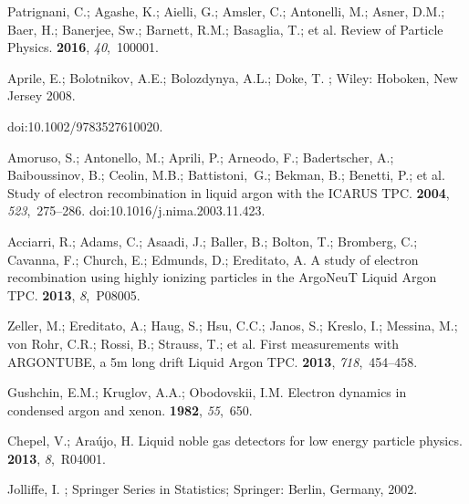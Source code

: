 \documentclass[instruments,article,accept,moreauthors,pdftex]{Definitions/mdpi}
\begin{document}
\begin{thebibliography}{999}
Patrignani, C.; Agashe, K.; Aielli, G.; Amsler, C.; Antonelli, M.; Asner, D.M.; Baer, H.; Banerjee, Sw.; Barnett, R.M.; Basaglia, T.; et al.   
\newblock Review of Particle Physics.
 {\bf 2016}, {\em 40},~100001.

Aprile, E.; Bolotnikov, A.E.; Bolozdynya, A.L.; Doke, T.
; Wiley: Hoboken, New Jersey  2008.

\newblock
  doi:10.1002/9783527610020.

Amoruso, S.; Antonello, M.; Aprili, P.; Arneodo, F.; Badertscher, A.; Baiboussinov, B.; Ceolin, M.B.; Battistoni,~G.; Bekman, B.; Benetti, P.; et al.
\newblock Study of electron recombination in liquid argon with the ICARUS TPC.
 {\bf 2004},
  {\em 523},~275--286.
\newblock
  doi:10.1016/j.nima.2003.11.423.

Acciarri, R.; Adams, C.; Asaadi, J.; Baller, B.; Bolton, T.; Bromberg, C.; Cavanna, F.; Church, E.; Edmunds, D.; Ereditato, A.
\newblock A study of electron recombination using highly ionizing particles in
  the ArgoNeuT Liquid Argon TPC.
 {\bf 2013}, {\em 8},~P08005.

Zeller, M.; Ereditato, A.; Haug, S.; Hsu, C.C.; Janos, S.; Kreslo, I.; Messina, M.; von Rohr, C.R.; Rossi, B.; Strauss, T.; et al.
\newblock First measurements with ARGONTUBE, a 5m long drift Liquid Argon TPC.
 {\bf 2013},
  {\em 718},~454--458.


Gushchin, E.M.; Kruglov, A.A.;  Obodovskii, I.M.
\newblock Electron dynamics in condensed argon and xenon.
 {\bf 1982},
  {\em 55},~650.

Chepel, V.; Araújo, H.
\newblock Liquid noble gas detectors for low energy particle physics.
 {\bf 2013}, {\em 8},~R04001.

Jolliffe, I.
; Springer Series in Statistics;
  {Springer}:  Berlin, Germany, 2002.


\end{thebibliography}
\end{document}
